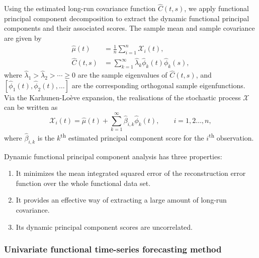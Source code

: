 \documentclass[12pt,a4paper]{article}
\newcommand{\X}{\mathcal{X}}
\begin{document}
Using the estimated long-run covariance function $\widehat{C}(t,s)$, we apply functional principal component decomposition to extract the dynamic functional principal components and their associated scores. The sample mean and sample covariance are given by
\begin{align*}
\widehat{\mu}(t) &= \frac{1}{n}\sum^n_{i=1}\X_i(t), \\
\widehat{C}(t,s) &= \sum^{\infty}_{k=1}\widehat{\lambda}_k\widehat{\phi}_k(t)\widehat{\phi}_k(s),
\end{align*}
where $\widehat{\lambda}_1>\widehat{\lambda}_2>\cdots \geq 0$ are the sample eigenvalues of $\widehat{C}(t,s)$, and $[\widehat{\phi}_1(t), \widehat{\phi}_2(t), \dots]$ are the corresponding orthogonal sample eigenfunctions. Via the Karhunen-Lo\`{e}ve expansion, the realisations of the stochastic process $\X$ can be written as
\begin{equation*}
\X_i(t) = \widehat{\mu}(t)+\sum^{\infty}_{k=1}\widehat{\beta}_{i,k}\widehat{\phi}_k(t),\qquad i=1,2\dots,n,
\end{equation*}
where $\widehat{\beta}_{i,k}$ is the $k$\textsuperscript{th} estimated principal component score for the $i$\textsuperscript{th} observation. 

Dynamic functional principal component analysis has three properties:
\begin{enumerate}
\item[(a)] It minimizes the mean integrated squared error of the reconstruction error function over the whole functional data set.
\item[(b)] It provides an effective way of extracting a large amount of long-run covariance.
\item[(c)] Its dynamic principal component scores are uncorrelated.
\end{enumerate}


\subsubsection{Univariate functional time-series forecasting method}\label{sec:fts}
\end{document}

